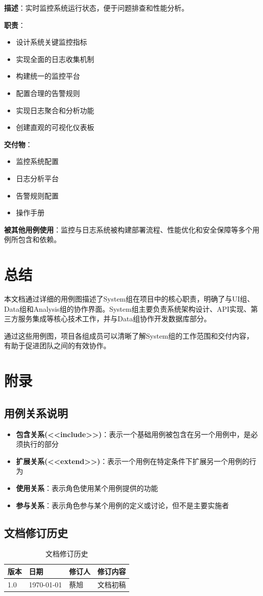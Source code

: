 \documentclass[a4paper,12pt]{article}
\begin{document}
\textbf{描述}：实时监控系统运行状态，便于问题排查和性能分析。

\textbf{职责}：
\begin{itemize}
  \item 设计系统关键监控指标
  \item 实现全面的日志收集机制
  \item 构建统一的监控平台
  \item 配置合理的告警规则
  \item 实现日志聚合和分析功能
  \item 创建直观的可视化仪表板
\end{itemize}

\textbf{交付物}：
\begin{itemize}
  \item 监控系统配置
  \item 日志分析平台
  \item 告警规则配置
  \item 操作手册
\end{itemize}

\textbf{被其他用例使用}：监控与日志系统被构建部署流程、性能优化和安全保障等多个用例所包含和依赖。

\section{总结}

本文档通过详细的用例图描述了System组在项目中的核心职责，明确了与UI组、Data组和Analysis组的协作界面。System组主要负责系统架构设计、API实现、第三方服务集成等核心技术工作，并与Data组协作开发数据库部分。

通过这些用例图，项目各组成员可以清晰了解System组的工作范围和交付内容，有助于促进团队之间的有效协作。

\section{附录}

\subsection{用例关系说明}

\begin{itemize}
  \item \textbf{包含关系(<<include>>)}：表示一个基础用例被包含在另一个用例中，是必须执行的部分
  \item \textbf{扩展关系(<<extend>>)}：表示一个用例在特定条件下扩展另一个用例的行为
  \item \textbf{使用关系}：表示角色使用某个用例提供的功能
  \item \textbf{参与关系}：表示角色参与某个用例的定义或讨论，但不是主要实施者
\end{itemize}

\subsection{文档修订历史}

\begin{table}[htbp]
\centering
\begin{tabular}{llll}
\toprule
\textbf{版本} & \textbf{日期} & \textbf{修订人} & \textbf{修订内容} \\
\midrule
1.0 & \today & 蔡旭 & 文档初稿 \\
\bottomrule
\end{tabular}
\caption{文档修订历史}
\end{table}
\end{document}
